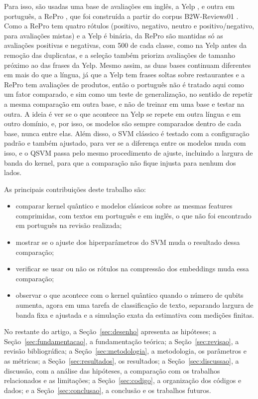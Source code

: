 \documentclass[conference]{IEEEtran}
\begin{document}
Para isso, são usadas uma base de avaliações em inglês, a Yelp \cite{kotzias2015}, e outra em português, a RePro \cite{repro2024}, que foi construída a partir do corpus B2W-Reviews01 \cite{real2019}. Como a RePro tem quatro rótulos (positivo, negativo, neutro e positivo/negativo, para avaliações mistas) e a Yelp é binária, da RePro são mantidas só as avaliações positivas e negativas, com 500 de cada classe, como na Yelp antes da remoção das duplicatas, e a seleção também prioriza avaliações de tamanho próximo ao das frases da Yelp. Mesmo assim, as duas bases continuam diferentes em mais do que a língua, já que a Yelp tem frases soltas sobre restaurantes e a RePro tem avaliações de produtos, então o português não é tratado aqui como um fator comparado, e sim como um teste de generalização, no sentido de repetir a mesma comparação em outra base, e não de treinar em uma base e testar na outra. A ideia é ver se o que acontece na Yelp se repete em outra língua e em outro domínio, e, por isso, os modelos são sempre comparados dentro de cada base, nunca entre elas. Além disso, o SVM clássico é testado com a configuração padrão e também ajustado, para ver se a diferença entre os modelos muda com isso, e o QSVM passa pelo mesmo procedimento de ajuste, incluindo a largura de banda do kernel, para que a comparação não fique injusta para nenhum dos lados.

As principais contribuições deste trabalho são:
\begin{itemize}
\item comparar kernel quântico e modelos clássicos sobre as mesmas features comprimidas, com textos em português e em inglês, o que não foi encontrado em português na revisão realizada;
\item mostrar se o ajuste dos hiperparâmetros do SVM muda o resultado dessa comparação;
\item verificar se usar ou não os rótulos na compressão dos embeddings muda essa comparação;
\item observar o que acontece com o kernel quântico quando o número de qubits aumenta, agora em uma tarefa de classificação de texto, separando largura de banda fixa e ajustada e a simulação exata da estimativa com medições finitas.
\end{itemize}

No restante do artigo, a Seção~\ref{sec:desenho} apresenta as hipóteses; a Seção~\ref{sec:fundamentacao}, a fundamentação teórica; a Seção~\ref{sec:revisao}, a revisão bibliográfica; a Seção~\ref{sec:metodologia}, a metodologia, os parâmetros e as métricas; a Seção~\ref{sec:resultados}, os resultados; a Seção~\ref{sec:discussao}, a discussão, com a análise das hipóteses, a comparação com os trabalhos relacionados e as limitações; a Seção~\ref{sec:codigo}, a organização dos códigos e dados; e a Seção~\ref{sec:conclusao}, a conclusão e os trabalhos futuros.
\end{document}

